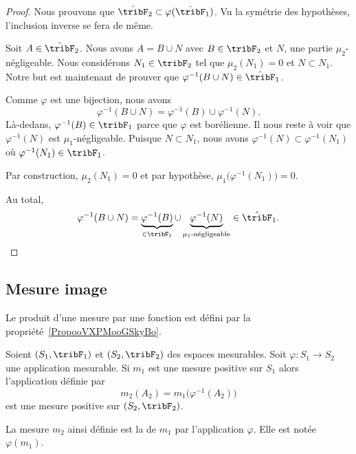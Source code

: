 \begin{proof}
	Nous prouvons que \( \hat\tribF_2\subset \varphi(\hat\tribF_1)\). Vu la symétrie des hypothèses, l'inclusion inverse se fera de même.

	Soit \( A\in\hat\tribF_2\). Nous avons \( A=B\cup N\) avec \( B\in \tribF_2\) et \( N\), une partie \( \mu_2\)-négligeable. Nous considérons \( N_1\in\tribF_2\) tel que \( \mu_2(N_1)=0\) et \( N\subset N_1\). Notre but est maintenant de prouver que \( \varphi^{-1}(B\cup N)\in \hat\tribF_1\).

	Comme \( \varphi\) est une bijection, nous avons
	\begin{equation}
		\varphi^{-1}(B\cup N)=\varphi^{-1}(B)\cup \varphi^{-1}(N).
	\end{equation}
	Là-dedans, \( \varphi^{-1}(B)\in \tribF_1\) parce que \( \varphi\) est borélienne. Il nous reste à voir que \( \varphi^{-1}(N)\) est \( \mu_1\)-négligeable. Puisque \( N\subset N_1\), nous avons \( \varphi^{-1}(N)\subset\varphi^{-1}(N_1)\) où \( \varphi^{-1}(N_1)\in\tribF_1\).

	Par construction, \( \mu_2(N_1)=0\) et par hypothèse, \( \mu_1\big( \varphi^{-1}(N_1) \big)=0\).

	Au total,
	\begin{equation}
		\varphi^{-1}(B\cup N)=\underbrace{\varphi^{-1}(B)}_{\in\tribF_1}\cup\underbrace{\varphi^{-1}(N)}_{\mu_1\text{-négligeable}}\in\hat\tribF_1.
	\end{equation}
\end{proof}

\subsection{Mesure image}

Le produit d'une mesure par une fonction est défini par la propriété~\ref{PropooVXPMooGSkyBo}.

\begin{propositionDef}     \label{PropJCJQooAdqrGA}
	Soient \( (S_1,\tribF_1)\) et \( (S_2,\tribF_2)\) des espaces mesurables. Soit \( \varphi\colon S_1\to S_2\) une application mesurable. Si \( m_1\) est une mesure positive sur \( S_1\) alors l'application définie par
	\begin{equation}
		m_2(A_2)=m_1\big( \varphi^{-1}(A_2) \big)
	\end{equation}
	est une mesure positive sur \( (S_2,\tribF_2)\).

	La mesure \( m_2\) ainsi définie est la  de \( m_1\) par l'application \( \varphi\). Elle est notée \( \varphi(m_1)\).
\end{propositionDef}

